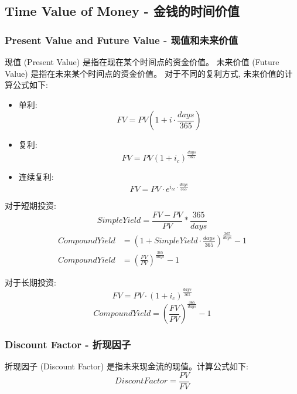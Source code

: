 \subsection{Time Value of Money - 金钱的时间价值}
\subsubsection{Present Value and Future Value - 现值和未来价值}
现值 (Present Value) 是指在现在某个时间点的资金价值。
未来价值 (Future Value) 是指在未来某个时间点的资金价值。
对于不同的复利方式, 未来价值的计算公式如下:
\begin{itemize}
    \item 单利:
          \begin{equation}
              FV = PV(1 + i \cdot \frac{days}{365})
          \end{equation}
    \item 复利:
          \begin{equation}
              FV = PV(1 + i_{c})^{\frac{days}{365}}
          \end{equation}
    \item 连续复利:
          \begin{equation}
              FV = PV \cdot e^{i_{cc} \cdot \frac{days}{365}}
          \end{equation}
\end{itemize}

对于短期投资:
\begin{equation}
    Simple Yield = \frac{FV - PV}{PV} * \frac{365}{days}
\end{equation}
\begin{equation}
    \begin{aligned}
        Compound Yield & = \left(1 + Simple Yield \cdot \frac{days}{365}\right)^{\frac{365}{days}} - 1 \\
        Compound Yield & = \left(\frac{FV}{PV}\right)^{\frac{365}{days}} - 1
    \end{aligned}
\end{equation}

对于长期投资:
\begin{equation}
    FV = PV \cdot (1 + i_{c})^{\frac{days}{365}}
\end{equation}
\begin{equation}
    Compound Yield = (\frac{FV}{PV})^{\frac{365}{days}} - 1
\end{equation}


\subsubsection{Discount Factor - 折现因子}
折现因子 (Discount Factor) 是指未来现金流的现值。计算公式如下:
\begin{equation}
    Discont Factor = \frac{PV}{FV}
\end{equation}

